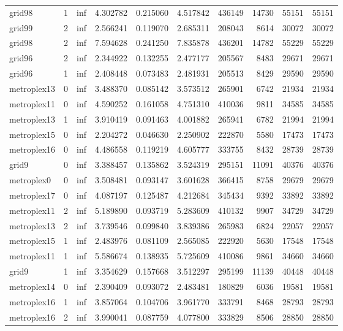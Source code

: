 \begin{longtable}{|l|r|r|r|r|r|r|r|r|r|}
grid98 & 1 & inf & 4.302782 & 0.215060 & 4.517842 & 436149 & 14730 & 55151 & 55151 \\
grid99 & 2 & inf & 2.566241 & 0.119070 & 2.685311 & 208043 & 8614 & 30072 & 30072 \\
grid98 & 2 & inf & 7.594628 & 0.241250 & 7.835878 & 436201 & 14782 & 55229 & 55229 \\
grid96 & 2 & inf & 2.344922 & 0.132255 & 2.477177 & 205567 & 8483 & 29671 & 29671 \\
grid96 & 1 & inf & 2.408448 & 0.073483 & 2.481931 & 205513 & 8429 & 29590 & 29590 \\
metroplex13 & 0 & inf & 3.488370 & 0.085142 & 3.573512 & 265901 & 6742 & 21934 & 21934 \\
metroplex11 & 0 & inf & 4.590252 & 0.161058 & 4.751310 & 410036 & 9811 & 34585 & 34585 \\
metroplex13 & 1 & inf & 3.910419 & 0.091463 & 4.001882 & 265941 & 6782 & 21994 & 21994 \\
metroplex15 & 0 & inf & 2.204272 & 0.046630 & 2.250902 & 222870 & 5580 & 17473 & 17473 \\
metroplex16 & 0 & inf & 4.486558 & 0.119219 & 4.605777 & 333755 & 8432 & 28739 & 28739 \\
grid9 & 0 & inf & 3.388457 & 0.135862 & 3.524319 & 295151 & 11091 & 40376 & 40376 \\
metroplex0 & 0 & inf & 3.508481 & 0.093147 & 3.601628 & 366415 & 8758 & 29679 & 29679 \\
metroplex17 & 0 & inf & 4.087197 & 0.125487 & 4.212684 & 345434 & 9392 & 33892 & 33892 \\
metroplex11 & 2 & inf & 5.189890 & 0.093719 & 5.283609 & 410132 & 9907 & 34729 & 34729 \\
metroplex13 & 2 & inf & 3.739546 & 0.099840 & 3.839386 & 265983 & 6824 & 22057 & 22057 \\
metroplex15 & 1 & inf & 2.483976 & 0.081109 & 2.565085 & 222920 & 5630 & 17548 & 17548 \\
metroplex11 & 1 & inf & 5.586674 & 0.138935 & 5.725609 & 410086 & 9861 & 34660 & 34660 \\
grid9 & 1 & inf & 3.354629 & 0.157668 & 3.512297 & 295199 & 11139 & 40448 & 40448 \\
metroplex14 & 0 & inf & 2.390409 & 0.093072 & 2.483481 & 180829 & 6036 & 19581 & 19581 \\
metroplex16 & 1 & inf & 3.857064 & 0.104706 & 3.961770 & 333791 & 8468 & 28793 & 28793 \\
metroplex16 & 2 & inf & 3.990041 & 0.087759 & 4.077800 & 333829 & 8506 & 28850 & 28850 \\

\end{longtable}
